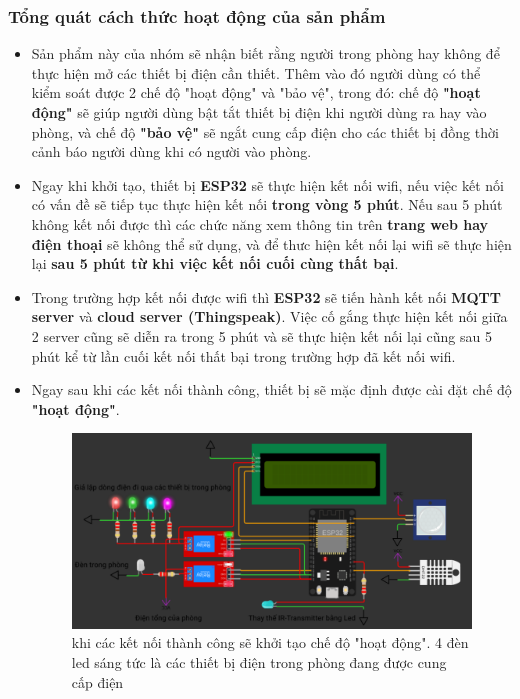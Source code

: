 \documentclass{report}
\begin{document}
\subsubsection{Tổng quát cách thức hoạt động của sản phẩm}
\begin{itemize}
    \item Sản phẩm này của nhóm sẽ nhận biết rằng người trong phòng hay không để thực hiện mở các thiết bị điện cần thiết. Thêm vào đó người dùng có thể kiểm soát được 2 chế độ "hoạt động" và "bảo vệ", trong đó: chế độ \textbf{"hoạt động"} sẽ giúp người dùng bật tắt thiết bị điện khi người dùng ra hay vào phòng, và chế độ \textbf{"bảo vệ"} sẽ ngắt cung cấp điện cho các thiết bị đồng thời cảnh báo người dùng khi có người vào phòng.

    \item Ngay khi khởi tạo, thiết bị \textbf{ESP32} sẽ thực hiện kết nối wifi, nếu việc kết nối có vấn đề sẽ tiếp tục thực hiện kết nối \textbf{trong vòng 5 phút}. Nếu sau 5 phút không kết nối được thì các chức năng xem thông tin trên \textbf{trang web hay điện thoại} sẽ không thể sử dụng, và để thưc hiện kết nối lại wifi sẽ thực hiện lại \textbf{sau 5 phút từ khi việc kết nối cuối cùng thất bại}.

    \item Trong trường hợp kết nối được wifi thì \textbf{ESP32} sẽ tiến hành kết nối \textbf{MQTT server} và \textbf{cloud server (Thingspeak)}. Việc cố gắng thực hiện kết nối giữa 2 server cũng sẽ diễn ra trong 5 phút và sẽ thực hiện kết nối lại cũng sau 5 phút kể từ lần cuối kết nối thất bại trong trường hợp đã kết nối wifi.
    
    \item Ngay sau khi các kết nối thành công, thiết bị sẽ mặc định được cài đặt chế độ \textbf{"hoạt động"}.
    \begin{figure}[!h]
        \centering
        \includegraphics[width=\textwidth, keepaspectratio]{img/Khoi_tao.png}
        \caption{khi các kết nối thành công sẽ khởi tạo chế độ "hoạt động". 4 đèn led sáng tức là các thiết bị điện trong phòng đang được cung cấp điện}
    \end{figure}


\end{itemize}
\end{document}
